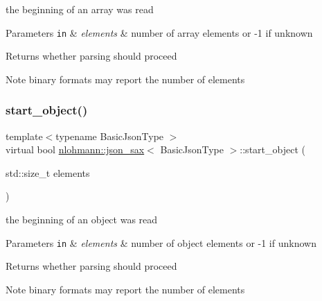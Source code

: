 the beginning of an array was read 


\begin{DoxyParams}[1]{Parameters}
\mbox{\tt in}  & {\em elements} & number of array elements or -\/1 if unknown \\
\hline
\end{DoxyParams}
\begin{DoxyReturn}{Returns}
whether parsing should proceed 
\end{DoxyReturn}
\begin{DoxyNote}{Note}
binary formats may report the number of elements 
\end{DoxyNote}
\mbox{\label{structnlohmann_1_1json__sax_a0671528b0debb5a348169d61f0382a0f}} 
\subsubsection{\texorpdfstring{start\+\_\+object()}{start\_object()}}
{\footnotesize\ttfamily template$<$typename Basic\+Json\+Type $>$ \\
virtual bool \hyperlink{structnlohmann_1_1json__sax}{nlohmann\+::json\+\_\+sax}$<$ Basic\+Json\+Type $>$\+::start\+\_\+object (\begin{DoxyParamCaption}\item[{std\+::size\+\_\+t}]{elements }\end{DoxyParamCaption})\hspace{0.3cm}{\ttfamily [pure virtual]}}



the beginning of an object was read 


\begin{DoxyParams}[1]{Parameters}
\mbox{\tt in}  & {\em elements} & number of object elements or -\/1 if unknown \\
\hline
\end{DoxyParams}
\begin{DoxyReturn}{Returns}
whether parsing should proceed 
\end{DoxyReturn}
\begin{DoxyNote}{Note}
binary formats may report the number of elements 
\end{DoxyNote}
\mbox{\label{structnlohmann_1_1json__sax_a07eab82f6c82d606787eee9ad73d2bda}} 
